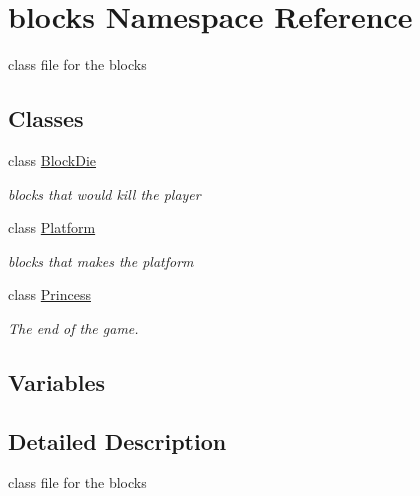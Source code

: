 \hypertarget{namespaceblocks}{}\section{blocks Namespace Reference}
\label{namespaceblocks}


class file for the blocks  


\subsection*{Classes}
\begin{DoxyCompactItemize}
\item 
class \hyperlink{classblocks_1_1_block_die}{Block\+Die}
\begin{DoxyCompactList}\small\item\em blocks that would kill the player \end{DoxyCompactList}\item 
class \hyperlink{classblocks_1_1_platform}{Platform}
\begin{DoxyCompactList}\small\item\em blocks that makes the platform \end{DoxyCompactList}\item 
class \hyperlink{classblocks_1_1_princess}{Princess}
\begin{DoxyCompactList}\small\item\em The end of the game. \end{DoxyCompactList}\end{DoxyCompactItemize}
\subsection*{Variables}
\begin{DoxyCompactItemize}
\end{DoxyCompactItemize}


\subsection{Detailed Description}
class file for the blocks 